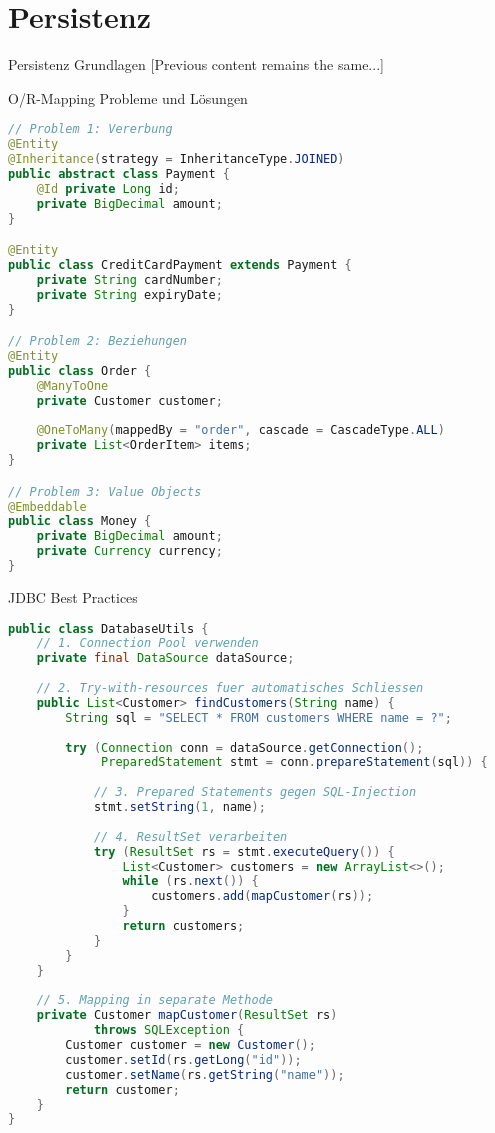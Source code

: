 \section{Persistenz}

\begin{concept}{Persistenz Grundlagen}
[Previous content remains the same...]
\end{concept}

\begin{example}{O/R-Mapping Probleme und Lösungen}
\begin{lstlisting}[language=Java]
// Problem 1: Vererbung
@Entity
@Inheritance(strategy = InheritanceType.JOINED)
public abstract class Payment {
    @Id private Long id;
    private BigDecimal amount;
}

@Entity
public class CreditCardPayment extends Payment {
    private String cardNumber;
    private String expiryDate;
}

// Problem 2: Beziehungen
@Entity
public class Order {
    @ManyToOne
    private Customer customer;
    
    @OneToMany(mappedBy = "order", cascade = CascadeType.ALL)
    private List<OrderItem> items;
}

// Problem 3: Value Objects
@Embeddable
public class Money {
    private BigDecimal amount;
    private Currency currency;
}
\end{lstlisting}
\end{example}

\begin{KR}{JDBC Best Practices}
\begin{lstlisting}[language=Java]
public class DatabaseUtils {
    // 1. Connection Pool verwenden
    private final DataSource dataSource;
    
    // 2. Try-with-resources fuer automatisches Schliessen
    public List<Customer> findCustomers(String name) {
        String sql = "SELECT * FROM customers WHERE name = ?";
        
        try (Connection conn = dataSource.getConnection();
             PreparedStatement stmt = conn.prepareStatement(sql)) {
            
            // 3. Prepared Statements gegen SQL-Injection
            stmt.setString(1, name);
            
            // 4. ResultSet verarbeiten
            try (ResultSet rs = stmt.executeQuery()) {
                List<Customer> customers = new ArrayList<>();
                while (rs.next()) {
                    customers.add(mapCustomer(rs));
                }
                return customers;
            }
        }
    }
    
    // 5. Mapping in separate Methode
    private Customer mapCustomer(ResultSet rs) 
            throws SQLException {
        Customer customer = new Customer();
        customer.setId(rs.getLong("id"));
        customer.setName(rs.getString("name"));
        return customer;
    }
}
\end{lstlisting}
\end{KR}

